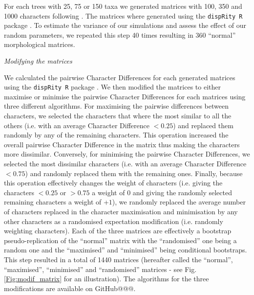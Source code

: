 \documentclass[12pt,letterpaper]{article}
\renewcommand{\subsection}[1]{%
\bigskip
\begin{center}
\begin{large}
\normalfont\itshape #1
\end{large}
\end{center}}
\begin{document}
For each trees with 25, 75 or 150 taxa we generated matrices with 100, 350 and 1000 characters following \cite{OReilly20160081}.
The matrices where generated using the \texttt{dispRity R} package \citep{thomas_guillerme_2016_55646}.
To estimate the variance of our simulations and assess the effect of our random parameters, we repeated this step 40 times resulting in 360 ``normal'' morphological matrices.

\subsection{Modifying the matrices}
We calculated the pairwise Character Differences for each generated matrices using the \texttt{dispRity R} package \citep{thomas_guillerme_2016_55646}.
We then modified the matrices to either maximise or minimise the pairwise Character Differences for each matrices using three different algorithms.
For maximising the pairwise differences between characters, we selected the characters that where the most similar to all the others (i.e. with an average Character Difference $<0.25$) and replaced them randomly by any of the remaining characters.
This operation increased the overall pairwise Character Difference in the matrix thus making the characters more dissimilar.
Conversely, for minimising the pairwise Character Differences, we selected the most dissimilar characters (i.e. with an average Character Difference $<0.75$) and randomly replaced them with the remaining ones.
Finally, because this operation effectively changes the weight of characters (i.e. giving the characters $<0.25$ or $>0.75$ a weight of $0$ and giving the randomly selected remaining characters a weight of +$1$), we randomly replaced the average number of characters replaced in the character maximisation and minimisation by any other characters as a randomised expectation modification (i.e. randomly weighting characters).
Each of the three matrices are effectively a bootstrap pseudo-replication of the ``normal'' matrix with the ``randomised'' one being a random one and the ``maximised'' and ``minimised'' being conditional bootstraps.
This step resulted in a total of 1440 matrices (hereafter called the ``normal'', ``maximised'', ``minimised'' and ``randomised'' matrices - see Fig. \ref{Fig:modif_matrix} for an illustration).
The algorithms for the three modifications are available on GitHub@@@. %
\end{document}
